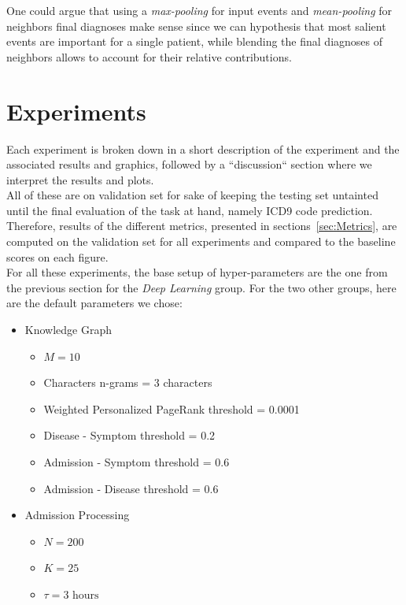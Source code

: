 One could argue that using a \emph{max-pooling} for input events and \emph{mean-pooling} for neighbors final diagnoses make sense since we can hypothesis that most salient events are important for a single patient, while blending the final diagnoses of neighbors allows to account for their relative contributions. \\

\section{Experiments}
\label{sec:Experiments}
Each experiment is broken down in a short description of the experiment and the associated results and graphics, followed by a ``discussion`` section where we interpret the results and plots. \\

All of these are on validation set for sake of keeping the testing set untainted until the final evaluation of the task at hand, namely ICD9 code prediction. Therefore, results of the different metrics, presented in sections~\ref{sec:Metrics}, are computed on the validation set for all experiments and compared to the baseline scores on each figure. \\

For all these experiments, the base setup of hyper-parameters are the one from the previous section for the \emph{Deep Learning} group. For the two other groups, here are the default parameters we chose:

\begin{itemize}
 \item Knowledge Graph
 \begin{itemize}
  \item $M=10$
  \item Characters n-grams = 3 characters
  \item Weighted Personalized PageRank threshold = 0.0001
  \item Disease - Symptom threshold = 0.2
  \item Admission - Symptom threshold = 0.6
  \item Admission - Disease threshold = 0.6
 \end{itemize}
 \item Admission Processing
 \begin{itemize}
  \item $N = 200$
  \item $K = 25$
  \item $\tau = 3 \mbox{ hours}$
 \end{itemize}
\end{itemize}

